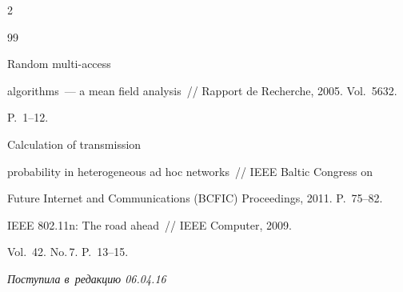 \begin{multicols}{2}
{{\begin{thebibliography}{99}


 Random multi-access 


algorithms~--- a mean field analysis~// Rapport de Recherche, 2005. Vol.~5632. 


P.~1--12.




 Calculation of transmission 


probability in heterogeneous ad hoc networks~// IEEE Baltic Congress on 


Future Internet and Communications (BCFIC) Proceedings, 2011. P.~75--82.




 IEEE 802.11n: The road ahead~// IEEE Computer, 2009. 


Vol.~42. No.\,7. P.~13--15.


\end{thebibliography}





 }


 }





\end{multicols}





\vspace*{-6pt}





\hfill{\small\textit{Поступила в~редакцию 06.04.16}}










\newpage





\vspace*{-30pt}















